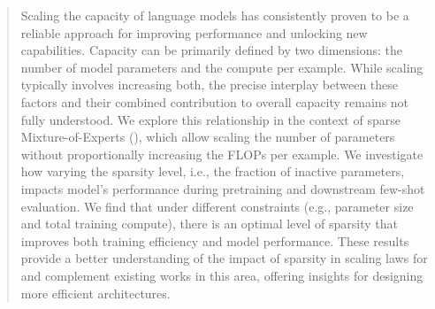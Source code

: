 \begin{abstract}   
Scaling the capacity of language models has consistently proven to be a reliable approach for improving performance and unlocking new capabilities. Capacity can be primarily defined by two dimensions: the number of model parameters and the compute per example. While scaling typically involves increasing both, the precise interplay between these factors and their combined contribution to overall capacity remains not fully understood.
We explore this relationship in the context of sparse Mixture-of-Experts (\moes), which allow scaling the number of parameters without proportionally increasing the FLOPs per example. 
We investigate how varying the sparsity level, i.e., the fraction of inactive parameters, impacts model's performance during pretraining and downstream few-shot evaluation. 
We find that under different constraints (e.g., parameter size and total training compute), there is an optimal level of sparsity that improves both training efficiency and model performance. 
These results provide a better understanding of the impact of sparsity in scaling laws for \moes and complement existing works in this area, offering insights for designing more efficient architectures.
\end{abstract}
